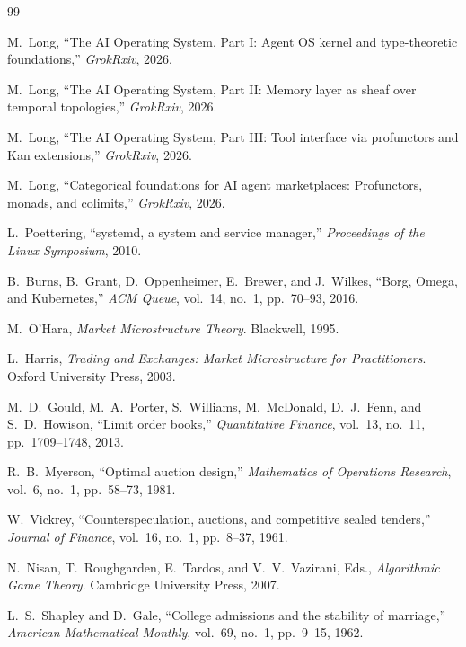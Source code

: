 \documentclass[12pt,a4paper]{article}
\theoremstyle{plain}
\theoremstyle{definition}
\begin{document}
\begin{thebibliography}{99}

M.~Long, ``The AI Operating System, Part I: Agent OS kernel and type-theoretic foundations,'' \emph{GrokRxiv}, 2026.

M.~Long, ``The AI Operating System, Part II: Memory layer as sheaf over temporal topologies,'' \emph{GrokRxiv}, 2026.

M.~Long, ``The AI Operating System, Part III: Tool interface via profunctors and Kan extensions,'' \emph{GrokRxiv}, 2026.

M.~Long, ``Categorical foundations for AI agent marketplaces: Profunctors, monads, and colimits,'' \emph{GrokRxiv}, 2026.

L.~Poettering, ``systemd, a system and service manager,'' \emph{Proceedings of the Linux Symposium}, 2010.

B.~Burns, B.~Grant, D.~Oppenheimer, E.~Brewer, and J.~Wilkes, ``Borg, Omega, and Kubernetes,'' \emph{ACM Queue}, vol.~14, no.~1, pp.~70--93, 2016.

M.~O'Hara, \emph{Market Microstructure Theory}. Blackwell, 1995.

L.~Harris, \emph{Trading and Exchanges: Market Microstructure for Practitioners}. Oxford University Press, 2003.

M.~D.~Gould, M.~A.~Porter, S.~Williams, M.~McDonald, D.~J.~Fenn, and S.~D.~Howison, ``Limit order books,'' \emph{Quantitative Finance}, vol.~13, no.~11, pp.~1709--1748, 2013.

R.~B.~Myerson, ``Optimal auction design,'' \emph{Mathematics of Operations Research}, vol.~6, no.~1, pp.~58--73, 1981.

W.~Vickrey, ``Counterspeculation, auctions, and competitive sealed tenders,'' \emph{Journal of Finance}, vol.~16, no.~1, pp.~8--37, 1961.

N.~Nisan, T.~Roughgarden, E.~Tardos, and V.~V.~Vazirani, Eds., \emph{Algorithmic Game Theory}. Cambridge University Press, 2007.

L.~S.~Shapley and D.~Gale, ``College admissions and the stability of marriage,'' \emph{American Mathematical Monthly}, vol.~69, no.~1, pp.~9--15, 1962.


\end{thebibliography}
\end{document}

